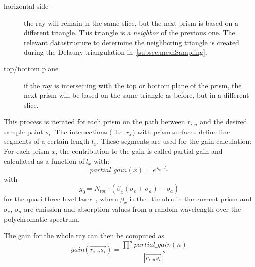 \begin{description}

  \item[horizontal side]
    the ray will remain in the same slice, but the next prism is based on a
    different triangle. This triangle is a \emph{neighbor} of the previous one.
    The relevant datastructure to determine the neighboring triangle is created
    during the Delauny triangulation in~\cref{subsec:meshSampling}.

  \item[top/bottom plane]
    if the ray is intersecting with the top or bottom plane of the prism, the
    next prism will be based on the same triangle as before, but in a different
    slice.

\end{description}
This process is iterated for each prism on the path between $r_{i,u}$ and the
desired sample point $s_i$. The intersections (like~$r_x$) with prism surfaces
define line segments of a certain length $l_x$. These segments are used for the
gain calculation: For each prism $x$, the contribution to the gain is called
partial gain and calculated as a function of $l_x$ with:
\begin{equation}
\label{eq:partial_gain}
  partial\_gain(x) = e^{~g_0 \cdot l_x}
\end{equation}
with 
\begin{equation}
\label{eq:gain_local}
  g_0 = N_{tot} \cdot (\beta_x(\sigma_e + \sigma_a) - \sigma_a) 
\end{equation}
for the quasi three-level laser~\cite{Intro4},
where $\beta_x$ is the stimulus in the current
prism and $\sigma_e$, $\sigma_a$ are emission and absorption
values from a random wavelength over the polychromatic spectrum.

The gain for the whole ray can then be computed as
\begin{equation}
\label{eq:gain}
  gain(\overrightarrow{r_{i,u}s_i}) =  
  \frac{\prod^npartial\_gain(n)}{ |\overrightarrow{r_{i,u}s_i}|^2}  
\end{equation}


